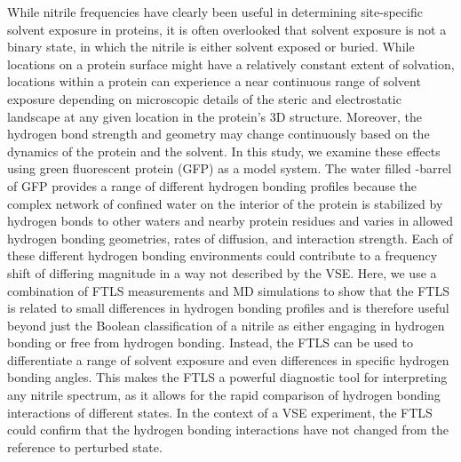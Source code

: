 While nitrile frequencies have clearly been useful in determining site-specific solvent exposure in proteins, it is often overlooked that solvent exposure is not a binary state, in which the nitrile is either solvent exposed or buried.
While locations on a protein surface might have a relatively constant extent of solvation, locations within a protein can experience a near continuous range of solvent exposure depending on microscopic details of the steric and electrostatic landscape at any given location in the protein's 3D structure.
Moreover, the hydrogen bond strength and geometry may change continuously based on the dynamics of the protein and the solvent.
In this study, we examine these effects using green fluorescent protein (GFP) as a model system.
The water filled \textbeta{}-barrel of GFP provides a range of different hydrogen bonding profiles because the complex network of confined water on the interior of the protein is stabilized by hydrogen bonds to other waters and nearby protein residues and varies in allowed hydrogen bonding geometries, rates of diffusion, and interaction strength.
Each of these different hydrogen bonding environments could contribute to a frequency shift of differing magnitude in a way not described by the VSE.
Here, we use a combination of FTLS measurements and MD simulations to show that the FTLS is related to small differences in hydrogen bonding profiles and is therefore useful beyond just the Boolean classification of a nitrile as either engaging in hydrogen bonding or free from hydrogen bonding.
Instead, the FTLS can be used to differentiate a range of solvent exposure and even differences in specific hydrogen bonding angles.
This makes the FTLS a powerful diagnostic tool for interpreting any nitrile spectrum, as it allows for the rapid comparison of hydrogen bonding interactions of different states.
In the context of a VSE experiment, the FTLS could confirm that the hydrogen bonding interactions have not changed from the reference to perturbed state. 

